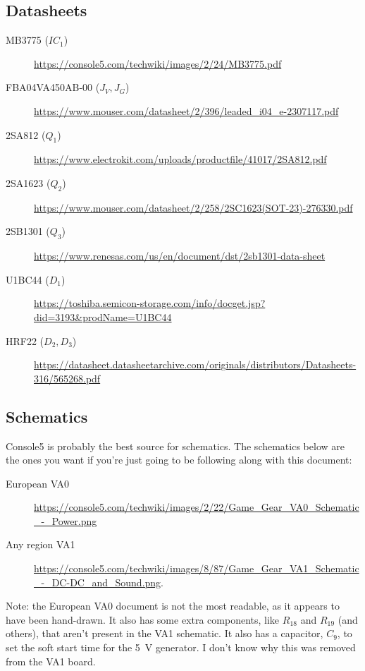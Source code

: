 \documentclass{article}
\newcommand{\model}{\textsf}
\begin{document}
\subsection{Datasheets}
\begin{description}
\item[\model{MB3775} ($IC_1$)]
  \url{https://console5.com/techwiki/images/2/24/MB3775.pdf}
\item[\model{FBA04VA450AB-00} ($J_V,J_G$)]
  \url{https://www.mouser.com/datasheet/2/396/leaded_i04_e-2307117.pdf}
\item[\model{2SA812} ($Q_1$)]
  \url{https://www.electrokit.com/uploads/productfile/41017/2SA812.pdf}
\item[\model{2SA1623} ($Q_2$)]
  \url{https://www.mouser.com/datasheet/2/258/2SC1623(SOT-23)-276330.pdf}
\item[\model{2SB1301} ($Q_3$)]
  \url{https://www.renesas.com/us/en/document/dst/2sb1301-data-sheet}
\item[\model{U1BC44} ($D_1$)]
  \url{https://toshiba.semicon-storage.com/info/docget.jsp?did=3193&prodName=U1BC44}
  
\item[\model{HRF22} ($D_2,D_3$)]
  \url{https://datasheet.datasheetarchive.com/originals/distributors/Datasheets-316/565268.pdf}
\end{description}

\subsection{Schematics}
\label{sec:documents_schematics}
Console5 is probably the best source for schematics. The schematics
below are the ones you want if you're just going to be following along
with this document:
\begin{description}
\item[European \model{VA0}]
  \url{https://console5.com/techwiki/images/2/22/Game_Gear_VA0_Schematic_-_Power.png}
\item[Any region \model{VA1}]
  \url{https://console5.com/techwiki/images/8/87/Game_Gear_VA1_Schematic_-_DC-DC_and_Sound.png}.
\end{description}

Note: the European \model{VA0} document is not the most readable, as it
appears to have been hand-drawn. It also has some extra components,
like $R_{18}$ and $R_{19}$ (and others), that aren't present in the
\model{VA1} schematic. It also has a capacitor, $C_9$, to set the soft start
time for the \qty{5}{\volt} generator. I don't know why this was
removed from the \model{VA1} board.
\end{document}
